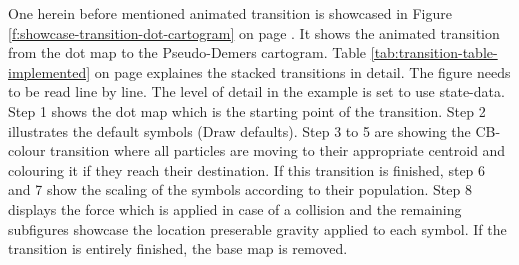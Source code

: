 One herein before mentioned animated transition is showcased in Figure \ref{f:showcase-transition-dot-cartogram} on page \pageref{f:showcase-transition-dot-cartogram}. It shows the animated transition from the dot map to the Pseudo-Demers cartogram. Table \ref{tab:transition-table-implemented} on page \pageref{tab:transition-table-implemented} explaines the stacked transitions in detail. The figure needs to be read line by line. The level of detail in the example is set to use state-data. Step 1 shows the dot map which is the starting point of the transition. Step 2 illustrates the default symbols (Draw defaults). Step 3 to 5 are showing the CB-colour transition where all particles are moving to their appropriate centroid and colouring it if they reach their destination. If this transition is finished, step 6 and 7 show the scaling of the symbols according to their population. Step 8 displays the force which is applied in case of a collision and the remaining subfigures showcase the location preserable gravity applied to each symbol. If the transition is entirely finished, the base map is removed.

